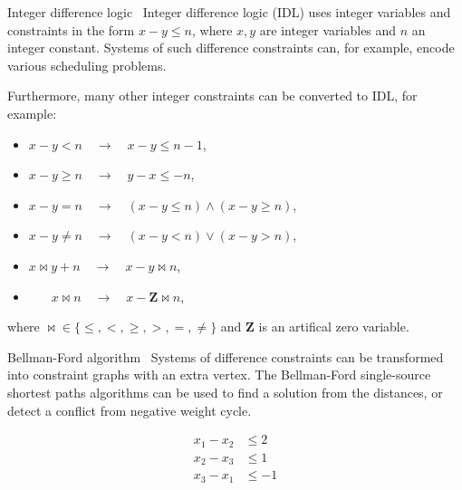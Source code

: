\documentclass{beamer}
\begin{document}
\begin{frame}[fragile,t]
\begin{columns}[t,onlytextwidth]
\begin{column}{0.485\textwidth}
		\begin{block}{Integer difference logic~\cite{slides}}
			Integer difference logic (IDL) uses integer variables and constraints in the form $x - y \leq n$, where $x, y$ are integer variables and $n$ an integer constant. Systems of such difference constraints can, for example, encode various scheduling problems.
			
			Furthermore, many other integer constraints can be converted to IDL, for example:
			\begin{itemize}
				\item $x - y < n \quad\to\quad x - y \leq n - 1$,
				\item $x - y \geq n \quad\to\quad y - x \leq -n$,
				\item $x - y = n \quad\to\quad (x - y \leq n) \land (x - y \geq n)$,
				\item $x - y \neq n \quad\to\quad (x - y < n) \lor (x - y > n)$,
				\item $x \bowtie y + n \quad\to\quad x - y \bowtie n$,
				\item $\quad\;\;\: x \bowtie n \quad\to\quad x - \mathbf{Z} \bowtie n$,
			\end{itemize}
			where ${\bowtie} \in \{\leq, <, \geq, >, =, \neq\}$ and $\mathbf{Z}$ is an artifical zero variable.
		\end{block}

		\begin{block}{Bellman-Ford algorithm~\cite{CLRS}}
			Systems of difference constraints can be transformed into constraint graphs with an extra vertex. The Bellman-Ford single-source shortest paths algorithms can be used to find a solution from the distances, or detect a conflict from negative weight cycle.

			\begin{figure}[h]
				\centering
				\begin{subfigure}{0.3\linewidth}
					\centering
					\begin{align*}
						x_1 - x_2 &\leq 2 \\
						x_2 - x_3 &\leq 1 \\
						x_3 - x_1 &\leq -1 \\
					\end{align*}
				\end{subfigure}
				~
				\begin{subfigure}{0.5\linewidth}
					\centering
\end{subfigure}
\end{figure}
\end{block}
\end{column}
\end{columns}
\end{frame}
\end{document}
